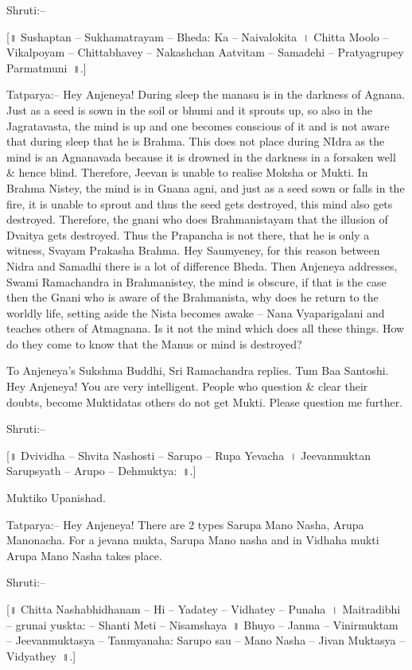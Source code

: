 Shruti:–

[॥ Sushaptan – Sukhamatrayam – Bheda: Ka – Naivalokita~। Chitta Moolo – Vikalpoyam – Chittabhavey – Nakashchan Aatvitam – Samadehi – Pratyagrupey Parmatmuni~॥.]

Tatparya:– Hey Anjeneya! During sleep the manasu is in the darkness of Agnana. Just as a seed is sown in the soil or bhumi and it sprouts up, so also in the Jagratavasta, the mind is up and one becomes conscious of it and is not aware that during sleep that he is Brahma. This does not place during NIdra as the mind is an Agnanavada because it is drowned in the darkness in a forsaken well \& hence blind. Therefore, Jeevan is unable to realise Moksha or Mukti. In Brahma Nistey, the mind is in Gnana agni, and just as a seed sown or falls in the fire, it is unable to sprout and thus the seed gets destroyed, this mind also gets destroyed. Therefore, the gnani who does Brahmanistayam that the illusion of Dvaitya gets destroyed. Thus the Prapancha is not there, that he is only a witness, Svayam Prakasha Brahma. Hey Saumyeney, for this reason between Nidra and Samadhi there is a lot of difference Bheda. Then Anjeneya addresses, Swami Ramachandra in Brahmanistey, the mind is obscure, if that is the case then the Gnani who is aware of the Brahmanista, why does he return to the worldly life, setting aside the Nista becomes awake – Nana Vyaparigalani and teaches others of Atmagnana. Is it not the mind which does all these things. How do they come to know that the Manus or mind is destroyed?

To Anjeneya's Sukshma Buddhi, Sri Ramachandra replies. Tum Baa Santoshi. Hey Anjeneya! You are very intelligent. People who question \& clear their doubts, become Muktidatas others do not get Mukti. Please question me further.

Shruti:–

[॥ Dvividha – Shvita Nashosti – Sarupo – Rupa Yevacha~। Jeevanmuktan Sarupsyath – Arupo – Dehmuktya:~॥.]

Muktiko Upanishad.

Tatparya:– Hey Anjeneya! There are 2 types Sarupa Mano Nasha, Arupa Manonacha. For a jevana mukta, Sarupa Mano nasha and in Vidhaha mukti Arupa Mano Nasha takes place.

Shruti:–

[॥ Chitta Nashabhidhanam – Hi – Yadatey – Vidhatey – Punaha~। Maitradibhi – grunai yuskta: – Shanti Meti – Nisamshaya~॥ Bhuyo – Janma – Vinirmuktam – Jeevanmuktasya – Tanmyanaha: Sarupo sau – Mano Nasha – Jivan Muktasya – Vidyathey~॥.]

